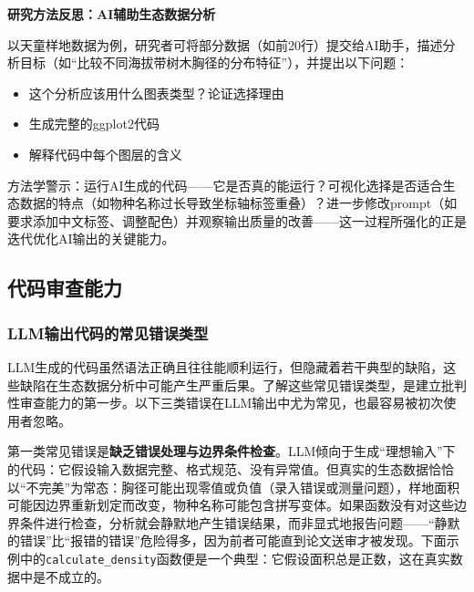\documentclass[
  twoside,12pt,fontset=none]{ctexbook}
\providecommand{\tightlist}{%
  \setlength{\itemsep}{0pt}\setlength{\parskip}{0pt}}
\renewenvironment{quote}{%
  \def\FrameCommand{{\color{quote-border}\vrule width 4pt}\hspace{10pt}}%
  \MakeFramed {\advance\hsize-\width \FrameRestore\noindent\ignorespaces}%
}{%
  \endMakeFramed
}
\begin{document}
\begin{quote}
\textbf{研究方法反思：AI辅助生态数据分析}

以天童样地数据为例，研究者可将部分数据（如前20行）提交给AI助手，描述分析目标（如``比较不同海拔带树木胸径的分布特征''），并提出以下问题：

\begin{itemize}
\tightlist
\item
  这个分析应该用什么图表类型？论证选择理由
\item
  生成完整的ggplot2代码
\item
  解释代码中每个图层的含义
\end{itemize}

方法学警示：运行AI生成的代码------它是否真的能运行？可视化选择是否适合生态数据的特点（如物种名称过长导致坐标轴标签重叠）？进一步修改prompt（如要求添加中文标签、调整配色）并观察输出质量的改善------这一过程所强化的正是迭代优化AI输出的关键能力。
\end{quote}

\hypertarget{ux4ee3ux7801ux5ba1ux67e5ux80fdux529b}{%
\subsection{代码审查能力}\label{ux4ee3ux7801ux5ba1ux67e5ux80fdux529b}}

\hypertarget{llmux8f93ux51faux4ee3ux7801ux7684ux5e38ux89c1ux9519ux8befux7c7bux578b}{%
\subsubsection{LLM输出代码的常见错误类型}\label{llmux8f93ux51faux4ee3ux7801ux7684ux5e38ux89c1ux9519ux8befux7c7bux578b}}

LLM生成的代码虽然语法正确且往往能顺利运行，但隐藏着若干典型的缺陷，这些缺陷在生态数据分析中可能产生严重后果。了解这些常见错误类型，是建立批判性审查能力的第一步。以下三类错误在LLM输出中尤为常见，也最容易被初次使用者忽略。

第一类常见错误是\textbf{缺乏错误处理与边界条件检查}。LLM倾向于生成``理想输入''下的代码：它假设输入数据完整、格式规范、没有异常值。但真实的生态数据恰恰以``不完美''为常态：胸径可能出现零值或负值（录入错误或测量问题），样地面积可能因边界重新划定而改变，物种名称可能包含拼写变体。如果函数没有对这些边界条件进行检查，分析就会静默地产生错误结果，而非显式地报告问题------``静默的错误''比``报错的错误''危险得多，因为前者可能直到论文送审才被发现。下面示例中的\texttt{calculate\_density}函数便是一个典型：它假设面积总是正数，这在真实数据中是不成立的。
\end{document}
